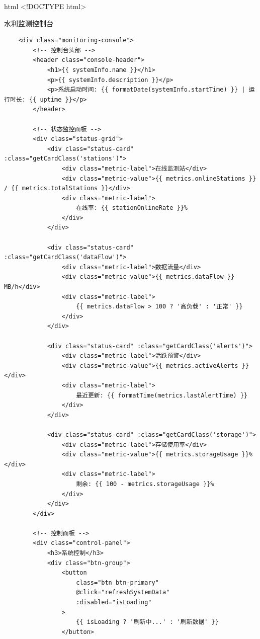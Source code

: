 html \textless!DOCTYPE html\textgreater{}

水利监测控制台

\begin{verbatim}
    <div class="monitoring-console">
        <!-- 控制台头部 -->
        <header class="console-header">
            <h1>{{ systemInfo.name }}</h1>
            <p>{{ systemInfo.description }}</p>
            <p>系统启动时间: {{ formatDate(systemInfo.startTime) }} | 运行时长: {{ uptime }}</p>
        </header>
        
        <!-- 状态监控面板 -->
        <div class="status-grid">
            <div class="status-card" :class="getCardClass('stations')">
                <div class="metric-label">在线监测站</div>
                <div class="metric-value">{{ metrics.onlineStations }} / {{ metrics.totalStations }}</div>
                <div class="metric-label">
                    在线率: {{ stationOnlineRate }}%
                </div>
            </div>
            
            <div class="status-card" :class="getCardClass('dataFlow')">
                <div class="metric-label">数据流量</div>
                <div class="metric-value">{{ metrics.dataFlow }} MB/h</div>
                <div class="metric-label">
                    {{ metrics.dataFlow > 100 ? '高负载' : '正常' }}
                </div>
            </div>
            
            <div class="status-card" :class="getCardClass('alerts')">
                <div class="metric-label">活跃预警</div>
                <div class="metric-value">{{ metrics.activeAlerts }}</div>
                <div class="metric-label">
                    最近更新: {{ formatTime(metrics.lastAlertTime) }}
                </div>
            </div>
            
            <div class="status-card" :class="getCardClass('storage')">
                <div class="metric-label">存储使用率</div>
                <div class="metric-value">{{ metrics.storageUsage }}%</div>
                <div class="metric-label">
                    剩余: {{ 100 - metrics.storageUsage }}%
                </div>
            </div>
        </div>
        
        <!-- 控制面板 -->
        <div class="control-panel">
            <h3>系统控制</h3>
            <div class="btn-group">
                <button 
                    class="btn btn-primary" 
                    @click="refreshSystemData"
                    :disabled="isLoading"
                >
                    {{ isLoading ? '刷新中...' : '刷新数据' }}
                </button>
                

\end{verbatim}
